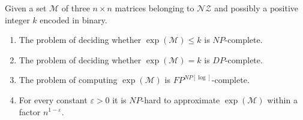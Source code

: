 \documentclass[a4paper,USenglish]{lipics}
\theoremstyle{definition}
\begin{document}
\begin{theorem}
\label{th:nzrcComplexity}
Given a set $\mathcal{M}$ of three $n \times n$ matrices belonging to $\mathscr{NZ}$ and possibly a positive integer $k$ encoded in binary.
\begin{enumerate}
\item The problem of deciding whether $\exp(\mathcal{M}) \leq k$ is $NP$-complete.
\item The problem of deciding whether $\exp(\mathcal{M}) = k$ is $DP$-complete.
\item The problem of computing $\exp(\mathcal{M})$ is $FP^{NP[\log]}$-complete.
\item For every constant $\varepsilon>0$ it is $NP$-hard to approximate $\exp(\mathcal{M})$ within a factor $n^{1-\varepsilon}$.
\end{enumerate}
\end{theorem}
\end{document}
